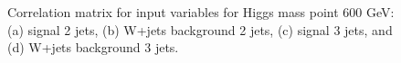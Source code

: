 \begin{figure}[bthp!]
\caption{\label{fig:FigCorr600Mu} 
Correlation matrix for input variables for Higgs mass point 600 GeV:
(a) signal 2 jets, (b) W+jets background 2 jets, 
(c) signal 3 jets, and (d) W+jets background 3 jets.
}
\end{figure}
